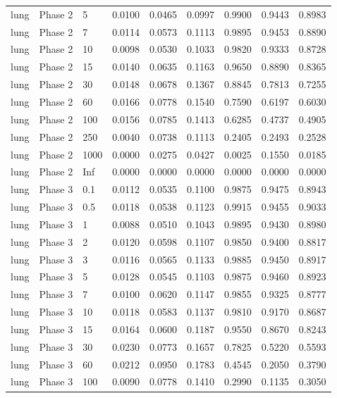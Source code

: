 \begin{tabular}{lllllllll}
  lung & Phase 2 & 5 & 0.0100 & 0.0465 & 0.0997 & 0.9900 & 0.9443 & 0.8983 \\ 
  lung & Phase 2 & 7 & 0.0114 & 0.0573 & 0.1113 & 0.9895 & 0.9453 & 0.8890 \\ 
  lung & Phase 2 & 10 & 0.0098 & 0.0530 & 0.1033 & 0.9820 & 0.9333 & 0.8728 \\ 
  lung & Phase 2 & 15 & 0.0140 & 0.0635 & 0.1163 & 0.9650 & 0.8890 & 0.8365 \\ 
  lung & Phase 2 & 30 & 0.0148 & 0.0678 & 0.1367 & 0.8845 & 0.7813 & 0.7255 \\ 
  lung & Phase 2 & 60 & 0.0166 & 0.0778 & 0.1540 & 0.7590 & 0.6197 & 0.6030 \\ 
  lung & Phase 2 & 100 & 0.0156 & 0.0785 & 0.1413 & 0.6285 & 0.4737 & 0.4905 \\ 
  lung & Phase 2 & 250 & 0.0040 & 0.0738 & 0.1113 & 0.2405 & 0.2493 & 0.2528 \\ 
  lung & Phase 2 & 1000 & 0.0000 & 0.0275 & 0.0427 & 0.0025 & 0.1550 & 0.0185 \\ 
  lung & Phase 2 & Inf & 0.0000 & 0.0000 & 0.0000 & 0.0000 & 0.0000 & 0.0000 \\ 
  lung & Phase 3 & 0.1 & 0.0112 & 0.0535 & 0.1100 & 0.9875 & 0.9475 & 0.8943 \\ 
  lung & Phase 3 & 0.5 & 0.0118 & 0.0538 & 0.1123 & 0.9915 & 0.9455 & 0.9033 \\ 
  lung & Phase 3 & 1 & 0.0088 & 0.0510 & 0.1043 & 0.9895 & 0.9430 & 0.8980 \\ 
  lung & Phase 3 & 2 & 0.0120 & 0.0598 & 0.1107 & 0.9850 & 0.9400 & 0.8817 \\ 
  lung & Phase 3 & 3 & 0.0116 & 0.0565 & 0.1133 & 0.9885 & 0.9450 & 0.8917 \\ 
  lung & Phase 3 & 5 & 0.0128 & 0.0545 & 0.1103 & 0.9875 & 0.9460 & 0.8923 \\ 
  lung & Phase 3 & 7 & 0.0100 & 0.0620 & 0.1147 & 0.9855 & 0.9325 & 0.8777 \\ 
  lung & Phase 3 & 10 & 0.0118 & 0.0583 & 0.1137 & 0.9810 & 0.9170 & 0.8687 \\ 
  lung & Phase 3 & 15 & 0.0164 & 0.0600 & 0.1187 & 0.9550 & 0.8670 & 0.8243 \\ 
  lung & Phase 3 & 30 & 0.0230 & 0.0773 & 0.1657 & 0.7825 & 0.5220 & 0.5593 \\ 
  lung & Phase 3 & 60 & 0.0212 & 0.0950 & 0.1783 & 0.4545 & 0.2050 & 0.3790 \\ 
  lung & Phase 3 & 100 & 0.0090 & 0.0778 & 0.1410 & 0.2990 & 0.1135 & 0.3050 \\ 

\end{tabular}
